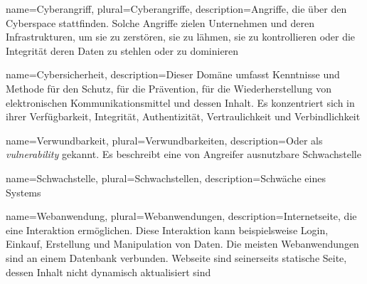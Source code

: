 


 {
    name={Cyberangriff},
    plural={Cyberangriffe},
    description={Angriffe, die über den Cyberspace stattfinden. Solche Angriffe zielen Unternehmen und deren Infrastrukturen, um sie zu zerstören, sie zu lähmen, sie zu kontrollieren oder die Integrität deren Daten zu stehlen oder zu dominieren \cite{NIST_Definitionen}}
}

 {
    name={Cybersicherheit},
    description={Dieser Domäne umfasst Kenntnisse und Methode für den Schutz, für die Prävention, für die Wiederherstellung von elektronischen Kommunikationsmittel und dessen Inhalt. Es konzentriert sich in ihrer Verfügbarkeit, Integrität, Authentizität, Vertraulichkeit und Verbindlichkeit \cite{NIST_Definitionen}}
}

 {
    name={Verwundbarkeit},
    plural={Verwundbarkeiten},
    description={Oder als \textit{vulnerability} gekannt. Es beschreibt eine von Angreifer ausnutzbare Schwachstelle \cite{Wendzel_It-Sicherheit}}
}

 {
    name={Schwachstelle},
    plural={Schwachstellen},
    description={Schwäche eines Systems \cite{Wendzel_It-Sicherheit}}
}

 {
    name={Webanwendung},
    plural={Webanwendungen},
    description={Internetseite, die eine Interaktion ermöglichen. Diese Interaktion kann beispielsweise Login, Einkauf, Erstellung und Manipulation von Daten. Die meisten Webanwendungen sind an einem Datenbank verbunden. Webseite sind seinerseits statische Seite, dessen Inhalt nicht dynamisch aktualisiert sind \cite{Essential_Desigs_Seite_x_Anwendung}}
}

